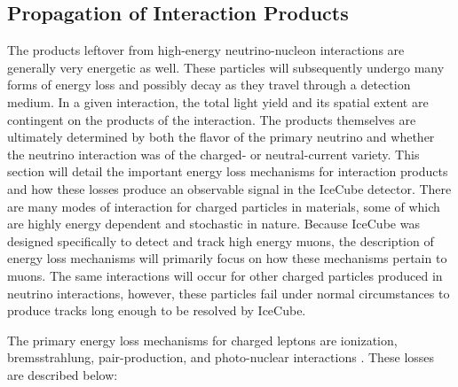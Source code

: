 \documentclass{gatech-thesis}
\begin{document}
\subsection{Propagation of Interaction Products}
The products leftover from high-energy neutrino-nucleon interactions are generally very energetic as well. These particles will subsequently undergo many forms of energy loss and possibly decay as they travel through a detection medium. In a given interaction, the total light yield and its spatial extent are contingent on the products of the interaction. The products themselves are ultimately determined by both the flavor of the primary neutrino and whether the neutrino interaction was of the charged- or neutral-current variety. This section will detail the important energy loss mechanisms for interaction products and how these losses produce an observable signal in the IceCube detector. There are many modes of interaction for charged particles in materials, some of which are highly energy dependent and stochastic in nature. Because IceCube was designed specifically to detect and track high energy muons, the description of energy loss mechanisms will primarily focus on how these mechanisms pertain to muons. The same interactions will occur for other charged particles produced in neutrino interactions, however, these particles fail under normal circumstances to produce tracks long enough to be resolved by IceCube.

The primary energy loss mechanisms for charged leptons are ionization, bremsstrahlung, pair-production, and photo-nuclear interactions \cite{2001PhRvD..63i4020I}. These losses are described below:
\end{document}

